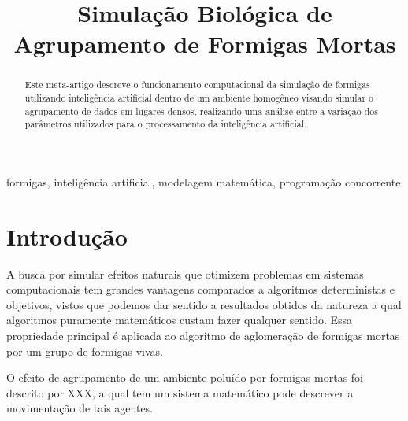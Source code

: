 \documentclass[conference]{IEEEtran}
\begin{document}
\title{Simulação Biológica de Agrupamento de Formigas Mortas}

\author{
\and
{}
}

\maketitle

\begin{abstract}
Este meta-artigo descreve o funcionamento computacional da simulação de formigas utilizando inteligência artificial dentro de um ambiente homogêneo visando simular o agrupamento de dados em lugares densos, realizando uma análise entre a variação dos parâmetros utilizados para o processamento da inteligência artificial.
\end{abstract}

\begin{IEEEkeywords}
formigas, inteligência artificial, modelagem matemática, programação concorrente
\end{IEEEkeywords}


\section{Introdução}

A busca por simular efeitos naturais que otimizem problemas em sistemas computacionais tem grandes vantagens comparados a algoritmos deterministas e objetivos, vistos que podemos dar sentido a resultados obtidos da natureza a qual algoritmos puramente matemáticos custam fazer qualquer sentido. Essa propriedade principal é aplicada ao algoritmo de aglomeração de formigas mortas por um grupo de formigas vivas.

O efeito de agrupamento de um ambiente poluído por formigas mortas foi descrito por XXX, a qual tem um sistema matemático pode descrever a movimentação de tais agentes.
\end{document}
